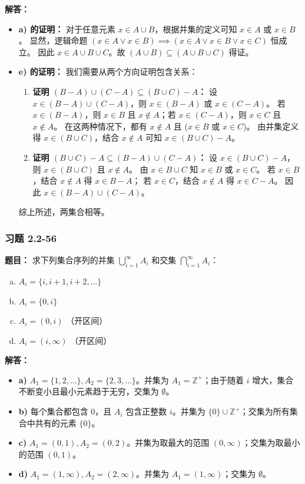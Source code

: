 \documentclass[11pt,UTF8]{article}
\begin{document}
\textbf{解答：}
\begin{itemize}
    \item \textbf{a) 的证明：}
    对于任意元素 $x \in A \cup B$，根据并集的定义可知 $x \in A$ 或 $x \in B$。
    显然，逻辑命题 $(x \in A \lor x \in B) \implies (x \in A \lor x \in B \lor x \in C)$ 恒成立。
    因此 $x \in A \cup B \cup C$。故 $(A \cup B) \subseteq (A \cup B \cup C)$ 得证。

    \item \textbf{e) 的证明：}
    我们需要从两个方向证明包含关系：
    \begin{enumerate}[1.]
        \item \textbf{证明 $(B - A) \cup (C - A) \subseteq (B \cup C) - A$：}
        设 $x \in (B - A) \cup (C - A)$，则 $x \in (B - A)$ 或 $x \in (C - A)$。
        若 $x \in (B - A)$，则 $x \in B$ 且 $x \notin A$；若 $x \in (C - A)$，则 $x \in C$ 且 $x \notin A$。
        在这两种情况下，都有 $x \notin A$ 且 ($x \in B$ 或 $x \in C$)。
        由并集定义得 $x \in (B \cup C)$，结合 $x \notin A$ 可知 $x \in (B \cup C) - A$。
        
        \item \textbf{证明 $(B \cup C) - A \subseteq (B - A) \cup (C - A)$：}
        设 $x \in (B \cup C) - A$，则 $x \in (B \cup C)$ 且 $x \notin A$。
        由 $x \in B \cup C$ 知 $x \in B$ 或 $x \in C$。
        若 $x \in B$，结合 $x \notin A$ 得 $x \in B - A$；
        若 $x \in C$，结合 $x \notin A$ 得 $x \in C - A$。
        因此 $x \in (B - A) \cup (C - A)$。
    \end{enumerate}
    综上所述，两集合相等。
\end{itemize}

\subsubsection*{习题 2.2-56}
\textbf{题目：} 求下列集合序列的并集 $\bigcup_{i=1}^{\infty} A_i$ 和交集 $\bigcap_{i=1}^{\infty} A_i$：
\begin{enumerate}[a)]
    \item $A_i = \{i, i + 1, i + 2, \dots \}$
    \item $A_i = \{0, i\}$
    \item $A_i = (0, i)$ （开区间）
    \item $A_i = (i, \infty)$ （开区间）
\end{enumerate}

\textbf{解答：}
\begin{itemize}
    \item \textbf{a)} $A_1=\{1,2,\dots\}, A_2=\{2,3,\dots\}$。并集为 $A_1 = \mathbb{Z}^+$；由于随着 $i$ 增大，集合不断变小且最小元素趋于无穷，交集为 $\emptyset$。
    \item \textbf{b)} 每个集合都包含 $0$，且 $A_i$ 包含正整数 $i$。并集为 $\{0\} \cup \mathbb{Z}^+$；交集为所有集合中共有的元素 $\{0\}$。
    \item \textbf{c)} $A_1=(0,1), A_2=(0,2)$。并集为取最大的范围 $(0, \infty)$；交集为取最小的范围 $(0, 1)$。
    \item \textbf{d)} $A_1=(1,\infty), A_2=(2,\infty)$。并集为 $A_1 = (1, \infty)$；交集为 $\emptyset$。
\end{itemize}
\end{document}

